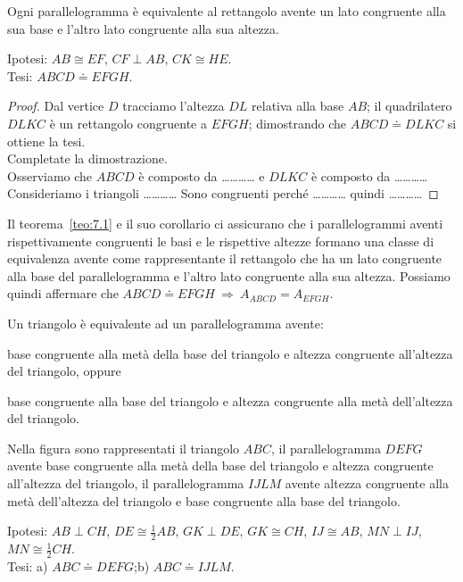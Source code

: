 \begin{corollario}
Ogni parallelogramma è equivalente al rettangolo avente un lato congruente alla sua base e l'altro lato congruente alla sua altezza.
\end{corollario}

\noindent Ipotesi: $AB\cong EF$, $CF\perp AB$, $CK\cong HE$.\\
Tesi: $ABCD\doteq EFGH$.

\begin{proof}
Dal vertice $D$ tracciamo l'altezza $DL$ relativa alla base $AB$; il quadrilatero $DLKC$ è un rettangolo congruente a $EFGH$; dimostrando che $ABCD\doteq DLKC$ si ottiene la tesi.\\
Completate la dimostrazione.\\
Osserviamo che $ABCD$ è composto da \ldots\ldots\ldots\ldots{}
e $DLKC$ è composto da \ldots\ldots\ldots\ldots{} 
Consideriamo i triangoli \ldots\ldots\ldots\ldots{}
Sono congruenti perché \ldots\ldots\ldots\ldots{}
quindi \ldots\ldots\ldots\ldots{}
\end{proof}

Il teorema~\ref{teo:7.1} e il suo corollario ci assicurano che i parallelogrammi aventi rispettivamente congruenti le basi e le rispettive altezze formano una classe di equivalenza avente come rappresentante il rettangolo che ha un lato congruente alla base del parallelogramma e l'altro lato congruente alla sua altezza. Possiamo quindi affermare che $ABCD\doteq EFGH \:\Rightarrow\: A_{ABCD} = A_{EFGH}$.

\begin{teorema}\label{teo:7.2}
Un triangolo è equivalente ad un parallelogramma avente:
\begin{enumeratea}
\item base congruente alla metà della base del triangolo e altezza congruente all'altezza del triangolo, oppure
\item base congruente alla base del triangolo e altezza congruente alla metà dell'altezza del triangolo.
\end{enumeratea}
\end{teorema}

Nella figura sono rappresentati il triangolo $ABC$, il parallelogramma $DEFG$ avente base congruente alla metà della base del triangolo e altezza congruente all'altezza del triangolo, il parallelogramma $IJLM$ avente altezza congruente alla metà dell'altezza del triangolo e base congruente alla base del triangolo.

\noindent Ipotesi: $AB\perp CH$, $DE\cong \frac{1}{2}AB$, $GK\perp DE$, $GK\cong CH$, $IJ\cong AB$, $MN\perp IJ$, $MN\cong \frac{1}{2}CH$.\\
Tesi: a) $ABC\doteq DEFG$;\quad b) $ABC\doteq IJLM$.

